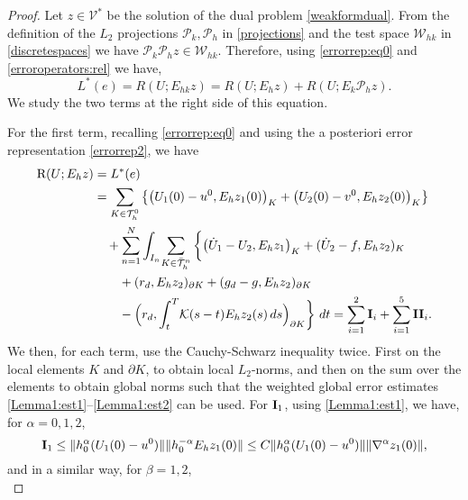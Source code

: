 \documentclass{amsart}
\numberwithin{equation}{section}
\theoremstyle{definition}
\begin{document}
\begin{proof}
Let $z\in{\mathcal V}^*$ be the solution of the dual problem
\eqref{weakformdual}.
From the definition of the $L_2$ projections ${\mathcal P}_k,{\mathcal P}_h$ in
\eqref{projections} and the test space ${\mathcal W}_{hk}$ in \eqref{discretespaces} we have ${\mathcal P}_k{\mathcal P}_hz\in {\mathcal W}_{hk}$.
Therefore, using \eqref{errorrep:eq0} and 
\eqref{erroroperators:rel} we have,
\begin{equation}   \label{aposteriori:eq1}
  L^*(e)=R(U;E_{hk}z)=R(U;E_h z)+R(U;E_k{\mathcal P}_h z).
\end{equation}
We study the two terms at the right side of this equation.

For the first term, 
recalling \eqref{errorrep:eq0} and using the a posteriori error representation \eqref{errorrep2}, 
we have
\begin{equation}   \label{R:UEh}
  \begin{split}
   {\text R}(U;E_h z)&=L^*(e)\\
   &=\sum_{K\in{\mathcal T}_h^0}\big\{
     \big(U_1(0)-u^0,E_hz_1(0)\big)_K
     +\big(U_2(0)-v^0,E_hz_2(0)\big)_K \big\}\\
   &\quad +\sum_{n=1}^N\int_{I_n}\!\sum_{K\in\bar{\mathcal T}_h^n}
      \bigg\{
      \big(\dot U_1-U_2,E_hz_1\big)_K
      +(\dot U_2-f,E_hz_2)_K\\
   &\quad\quad   +(r_d,E_hz_2)_{\partial K}
     +(g_d-g,E_hz_2)_{\partial K}\\
    &\quad\quad
     -\Big(r_d,\int_t^T\!
         {\mathcal K}(s-t)E_hz_2(s)\,ds\Big)_{\partial K}
        \bigg\} \  dt 
    =\sum_{i=1}^2 {\rm{\bf I}}_i 
     +\sum_{i=1}^5 {\rm{\bf II}}_i.
  \end{split}
\end{equation}
We then, for each term, use the Cauchy-Schwarz inequality twice.
First on the local elements $K$ and $\partial K$, to obtain local
$L_2$-norms, and then on the sum over the elements to obtain
global norms such that the weighted global error estimates 
\eqref{Lemma1:est1}--\eqref{Lemma1:est2} can be used.
For ${\rm{\bf I}}_1$, using \eqref{Lemma1:est1}, we have, 
for $\alpha=0,1,2$,
\begin{equation}   \label{I1}
  {\rm{\bf I}}_1\le
   \|h_0^\alpha(U_1(0)-u^0)\|\|h_0^{-\alpha} E_hz_1(0)\|
   \le C \|h_0^\alpha(U_1(0)-u^0)\| \|\nabla^\alpha z_1(0)\|,
\end{equation}
and in a similar way, for $\beta=1,2$,
\begin{equation}   \label{I2}

\end{equation}
\end{proof}
\end{document}
